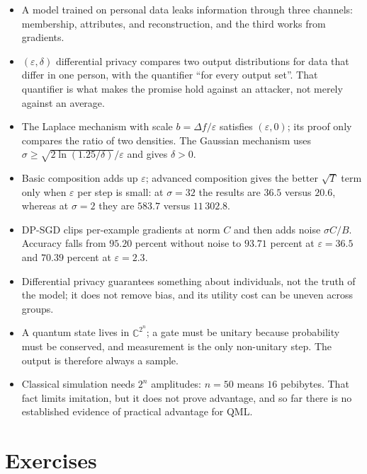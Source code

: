 \begin{ringkasan}
\begin{itemize}
  \item A model trained on personal data leaks information through three channels:
        membership, attributes, and reconstruction, and the third works from gradients.
  \item $(\varepsilon,\delta)$ differential privacy compares two output distributions for
        data that differ in one person, with the quantifier ``for every output set''. That
        quantifier is what makes the promise hold against an attacker, not merely against
        an average.
  \item The Laplace mechanism with scale $b=\Delta f/\varepsilon$ satisfies
        $(\varepsilon,0)$; its proof only compares the ratio of two densities. The Gaussian
        mechanism uses $\sigma\ge\sqrt{2\ln(1.25/\delta)}/\varepsilon$ and gives
        $\delta>0$.
  \item Basic composition adds up $\varepsilon$; advanced composition gives the better
        $\sqrt{T}$ term only when $\varepsilon$ per step is small: at $\sigma=32$ the
        results are $36.5$ versus $20.6$, whereas at $\sigma=2$ they are $583.7$ versus
        $11\,302.8$.
  \item DP-SGD clips per-example gradients at norm $C$ and then adds noise $\sigma C/B$.
        Accuracy falls from $95.20$ percent without noise to $93.71$ percent at
        $\varepsilon=36.5$ and $70.39$ percent at $\varepsilon=2.3$.
  \item Differential privacy guarantees something about individuals, not the truth of the
        model; it does not remove bias, and its utility cost can be uneven across groups.
  \item A quantum state lives in $\mathbb{C}^{2^{n}}$; a gate must be unitary because
        probability must be conserved, and measurement is the only non-unitary step. The
        output is therefore always a sample.
  \item Classical simulation needs $2^{n}$ amplitudes: $n=50$ means $16$ pebibytes. That
        fact limits imitation, but it does not prove advantage, and so far there is no
        established evidence of practical advantage for QML.
\end{itemize}
\end{ringkasan}

\section{Exercises}

